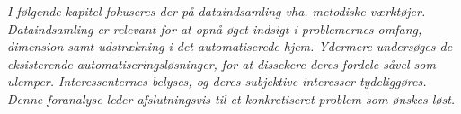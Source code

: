 \textit{I følgende kapitel fokuseres der på dataindsamling vha. metodiske værktøjer. Dataindsamling er relevant for at opnå øget indsigt i problemernes omfang, dimension samt udstrækning i det automatiserede hjem. Ydermere undersøges de eksisterende automatiseringsløsninger, for at dissekere deres fordele såvel som ulemper. Interessenternes belyses, og deres subjektive interesser tydeliggøres. Denne foranalyse leder afslutningsvis til et konkretiseret problem som ønskes løst.}